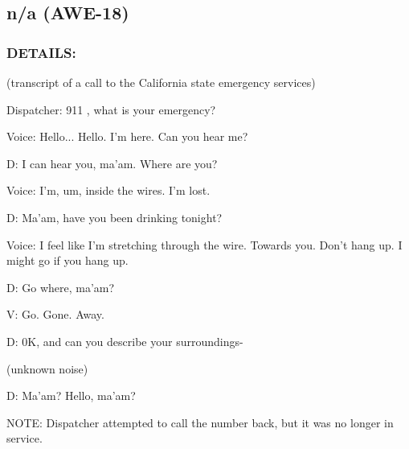 \subsection*{n/a (AWE-18)}
\subsubsection*{DETAILS:}
\par (transcript of a call to the California state emergency services)
\par Dispatcher: 911 , what is your emergency?
\par Voice: Hello... Hello. I'm here. Can you hear me?
\par D: I can hear you, ma'am. Where are you?
\par Voice: I'm, um, inside the wires. I'm lost.
\par D: Ma'am, have you been drinking tonight?
\par Voice: I feel like I'm stretching through the wire. Towards you.
Don't hang up. I might go if you hang up.
\par D: Go where, ma'am?
\par V: Go. Gone. Away.
\par D: 0K, and can you describe your surroundings-
\par (unknown noise)
\par D: Ma'am? Hello, ma'am?
\par NOTE: Dispatcher attempted to call the number back, but it was
no longer in service.